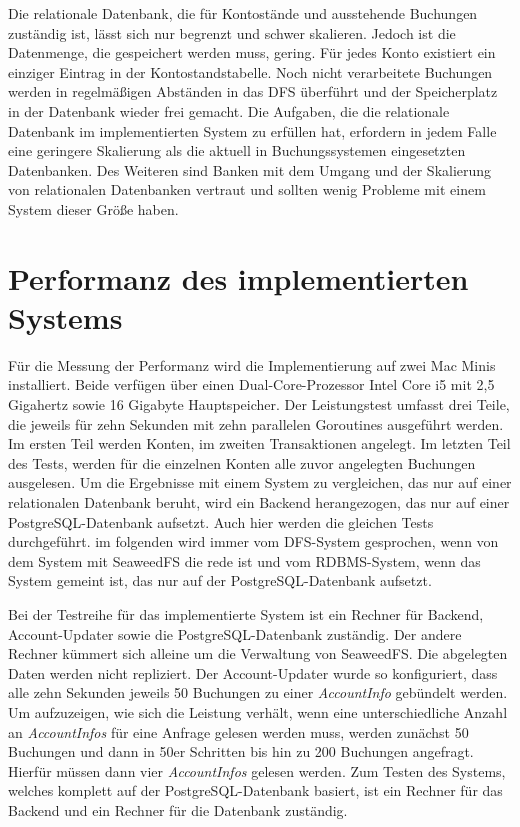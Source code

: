 \documentclass[12pt,oneside,a4paper,parskip]{scrbook}
\begin{document}
Die relationale Datenbank, die für Kontostände und ausstehende Buchungen zuständig ist, lässt sich nur begrenzt und schwer skalieren. Jedoch ist die Datenmenge, die gespeichert werden muss, gering. Für jedes Konto existiert ein einziger Eintrag in der Kontostandstabelle. Noch nicht verarbeitete Buchungen werden in regelmäßigen Abständen in das DFS überführt und der Speicherplatz in der Datenbank wieder frei gemacht. Die Aufgaben, die die relationale Datenbank im implementierten System zu erfüllen hat, erfordern in jedem Falle eine geringere Skalierung als die aktuell in Buchungssystemen eingesetzten Datenbanken. Des Weiteren sind Banken mit dem Umgang und der Skalierung von relationalen Datenbanken vertraut und sollten wenig Probleme mit einem System dieser Größe haben.


\section{Performanz des implementierten Systems}
Für die Messung der Performanz wird die Implementierung auf zwei Mac Minis installiert. Beide verfügen über einen Dual-Core-Prozessor Intel Core i5 mit 2,5 Gigahertz sowie 16 Gigabyte Hauptspeicher.
Der Leistungstest umfasst drei Teile, die jeweils für zehn Sekunden mit zehn parallelen Goroutines ausgeführt werden. Im ersten Teil werden Konten, im zweiten Transaktionen angelegt. Im letzten Teil des Tests, werden für die einzelnen Konten alle zuvor angelegten Buchungen ausgelesen. Um die Ergebnisse mit einem System zu vergleichen, das nur auf einer relationalen Datenbank beruht, wird ein Backend herangezogen, das nur auf einer PostgreSQL-Datenbank aufsetzt. Auch hier werden die gleichen Tests durchgeführt. im folgenden wird immer vom DFS-System gesprochen, wenn von dem System mit SeaweedFS die rede ist und vom RDBMS-System, wenn das System gemeint ist, das nur auf der PostgreSQL-Datenbank aufsetzt.

Bei der Testreihe für das implementierte System ist ein Rechner für Backend, Account-Updater sowie die PostgreSQL-Datenbank zuständig.
Der andere Rechner kümmert sich alleine um die Verwaltung von SeaweedFS. Die abgelegten Daten werden nicht repliziert. Der Account-Updater wurde so konfiguriert, dass alle zehn Sekunden jeweils 50 Buchungen zu einer \textit{AccountInfo} gebündelt werden. Um aufzuzeigen, wie sich die Leistung verhält, wenn eine unterschiedliche Anzahl an \textit{AccountInfos} für eine Anfrage gelesen werden muss, werden zunächst 50 Buchungen und dann in 50er Schritten bis hin zu 200 Buchungen angefragt. Hierfür müssen dann vier \textit{AccountInfos} gelesen werden. 
Zum Testen des Systems, welches komplett auf der PostgreSQL-Datenbank basiert, ist ein Rechner für das Backend und ein Rechner für die Datenbank zuständig.
\end{document}
